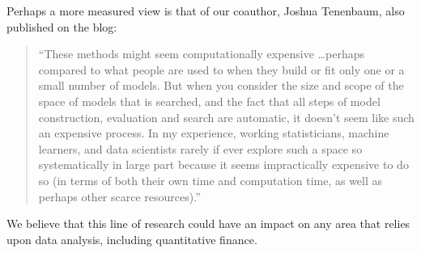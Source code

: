 \documentclass{article} %
\begin{document}
Perhaps a more measured view is that of our coauthor, Joshua Tenenbaum, also published on the blog:
\begin{quotation}
``These methods might seem computationally expensive \ldots perhaps compared to what people are used to when they build or fit only one or a small number of models.
But when you consider the size and scope of the space of models that is searched, and the fact that all steps of model construction, evaluation and search are automatic, it doesn't seem like such an expensive process.
In my experience, working statisticians, machine learners, and data scientists rarely if ever explore such a space so systematically in large part because it seems impractically expensive to do so (in terms of both their own time and computation time, as well as perhaps other scarce resources).''
\end{quotation}

We believe that this line of research could have an impact on any area that relies upon data analysis, including quantitative finance.



\end{document}
